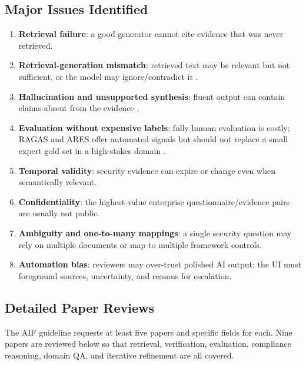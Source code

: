 \documentclass[11pt,journal,onecolumn]{IEEEtran}
\begin{document}
\subsection{Major Issues Identified}
\begin{enumerate}[leftmargin=1.7em]
    \item \textbf{Retrieval failure}: a good generator cannot cite evidence that was never retrieved.
    \item \textbf{Retrieval-generation mismatch}: retrieved text may be relevant but not sufficient, or the model may ignore/contradict it \cite{he2024covrag}.
    \item \textbf{Hallucination and unsupported synthesis}: fluent output can contain claims absent from the evidence \cite{manakul2023selfcheckgpt,dhuliawala2024cove}.
    \item \textbf{Evaluation without expensive labels}: fully human evaluation is costly; RAGAS and ARES offer automated signals but should not replace a small expert gold set in a high-stakes domain \cite{es2024ragas,saadfalcon2024ares}.
    \item \textbf{Temporal validity}: security evidence can expire or change even when semantically relevant.
    \item \textbf{Confidentiality}: the highest-value enterprise questionnaire/evidence pairs are usually not public.
    \item \textbf{Ambiguity and one-to-many mappings}: a single security question may rely on multiple documents or map to multiple framework controls.
    \item \textbf{Automation bias}: reviewers may over-trust polished AI output; the UI must foreground sources, uncertainty, and reasons for escalation.
\end{enumerate}

\subsection{Detailed Paper Reviews}
The AIF guideline requests at least five papers and specific fields for each. Nine papers are reviewed below so that retrieval, verification, evaluation, compliance reasoning, domain QA, and iterative refinement are all covered.
\end{document}
